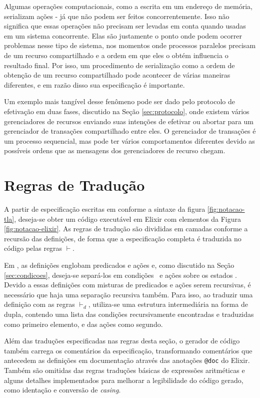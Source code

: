 Algumas operações computacionais, como a escrita em um endereço de memória,
serializam ações - já que não podem ser feitos concorrentemente. Isso não
significa que essas operações não precisam ser levadas em conta quando usadas em
um sistema concorrente. Elas são justamente o ponto onde podem ocorrer problemas
nesse tipo de sistema, nos momentos onde processos paralelos precisam de um
recurso compartilhado e a ordem em que eles o obtém influencia o resultado
final. Por isso, um procedimento de serialização como a ordem de obtenção de um
recurso compartilhado pode acontecer de várias maneiras diferentes, e em razão
disso sua especificação é importante.

Um exemplo mais tangível desse fenômeno pode ser dado pelo protocolo de
efetivação em duas fases, discutido na Seção \ref{sec:protocolo}, onde existem vários gerenciadores de recursos
enviando suas intenções de efetivar ou abortar para um gerenciador de transações
compartilhado entre eles. O gerenciador de transações é um processo sequencial,
mas pode ter vários comportamentos diferentes devido as possíveis ordens que as
mensagens dos gerenciadores de recurso chegam.

\section{Regras de Tradução}
\label{sec:regras}

A partir de especificação escritas em \TLAA conforme a sintaxe da figura
\ref{fig:notacao-tla}, deseja-se obter um código executável em Elixir com
elementos da Figura \ref{fig:notacao-elixir}. As regras de tradução são
divididas em camadas conforme a recursão das definições, de forma que a
especificação completa é traduzida no código pelas regras $\vdash$.



Em \TLAA, as definições \FANCYA englobam predicados e ações e, como discutido na
Seção \ref{sec:condicoes}, deseja-se separá-los em condições \ttc\ e ações sobre
os estados \tta. Devido a essas definições com misturas de predicados e ações
serem recursivas, é necessário que haja uma separação recursiva também. Para
isso, ao traduzir uma definição com as regras $\vdash_d$, utiliza-se uma
estrutura intermediária na forma de dupla, contendo uma lista das condições
recursivamente encontradas e traduzidas como primeiro elemento, e das ações como
segundo.

Além das traduções especificadas nas regras desta seção, o gerador de código
também carrega os comentários da especificação, transformando comentários que
antecedem as definições em documentação através das anotações \texttt{@doc} do
Elixir. Também são omitidas das regras traduções básicas de expressões
aritméticas e alguns detalhes implementados para melhorar a legibilidade do
código gerado, como identação e conversão de \textit{casing}. 

